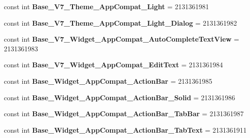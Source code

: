 \begin{DoxyCompactItemize}
const int {\bfseries Base\+\_\+\+V7\+\_\+\+Theme\+\_\+\+App\+Compat\+\_\+\+Light} = 2131361981
\item 
\mbox{\label{class_pinned_app_1_1_droid_1_1_resource_1_1_style_a2973d6a3991387772632f4f94baf9e80}} 
const int {\bfseries Base\+\_\+\+V7\+\_\+\+Theme\+\_\+\+App\+Compat\+\_\+\+Light\+\_\+\+Dialog} = 2131361982
\item 
\mbox{\label{class_pinned_app_1_1_droid_1_1_resource_1_1_style_a000132cfd78f61c909037b4be711f3e8}} 
const int {\bfseries Base\+\_\+\+V7\+\_\+\+Widget\+\_\+\+App\+Compat\+\_\+\+Auto\+Complete\+Text\+View} = 2131361983
\item 
\mbox{\label{class_pinned_app_1_1_droid_1_1_resource_1_1_style_aa57b0ccaf0c7d138e129b112f2956807}} 
const int {\bfseries Base\+\_\+\+V7\+\_\+\+Widget\+\_\+\+App\+Compat\+\_\+\+Edit\+Text} = 2131361984
\item 
\mbox{\label{class_pinned_app_1_1_droid_1_1_resource_1_1_style_ad767d9b0add1f95682164846944c4bb1}} 
const int {\bfseries Base\+\_\+\+Widget\+\_\+\+App\+Compat\+\_\+\+Action\+Bar} = 2131361985
\item 
\mbox{\label{class_pinned_app_1_1_droid_1_1_resource_1_1_style_a5582e7df140b3ae5f567394031f3c5ca}} 
const int {\bfseries Base\+\_\+\+Widget\+\_\+\+App\+Compat\+\_\+\+Action\+Bar\+\_\+\+Solid} = 2131361986
\item 
\mbox{\label{class_pinned_app_1_1_droid_1_1_resource_1_1_style_aecace761013f22683e911db44db16bee}} 
const int {\bfseries Base\+\_\+\+Widget\+\_\+\+App\+Compat\+\_\+\+Action\+Bar\+\_\+\+Tab\+Bar} = 2131361987
\item 
\mbox{\label{class_pinned_app_1_1_droid_1_1_resource_1_1_style_a8a3b34d64a3f1399f02b6402f812d3ca}} 
const int {\bfseries Base\+\_\+\+Widget\+\_\+\+App\+Compat\+\_\+\+Action\+Bar\+\_\+\+Tab\+Text} = 2131361911
\item 
\mbox{\label{class_pinned_app_1_1_droid_1_1_resource_1_1_style_a56ebf477f7224e82c2ce3017b0a694a6}} 

\end{DoxyCompactItemize}

